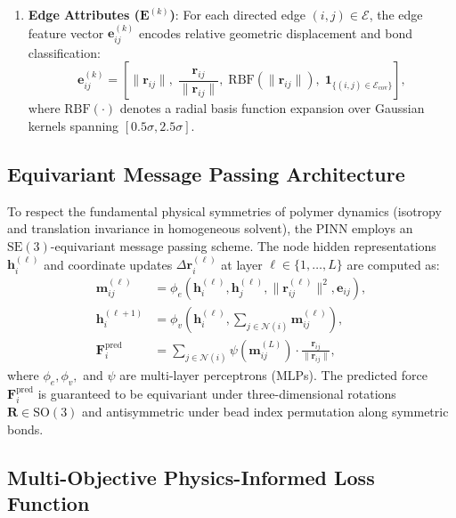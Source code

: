 \documentclass[12pt,a4paper]{article}
\begin{document}
\begin{enumerate}[label=\alph*)]
  \item \textbf{Edge Attributes ($\mathbf{E}^{(k)}$)}: For each directed edge $(i, j) \in \mathcal{E}$, the edge feature vector $\mathbf{e}_{ij}^{(k)}$ encodes relative geometric displacement and bond classification:
    \begin{equation}
      \mathbf{e}_{ij}^{(k)} = \left[ \|\mathbf{r}_{ij}\|,\; \frac{\mathbf{r}_{ij}}{\|\mathbf{r}_{ij}\|},\; \mathrm{RBF}(\|\mathbf{r}_{ij}\|),\; \mathbf{1}_{\{(i,j) \in \mathcal{E}_\text{cov}\}} \right],
    \end{equation}
    where $\mathrm{RBF}(\cdot)$ denotes a radial basis function expansion over Gaussian kernels spanning $[0.5\sigma, 2.5\sigma]$.
\end{enumerate}

\subsection{Equivariant Message Passing Architecture}
\label{sec:message-passing}

To respect the fundamental physical symmetries of polymer dynamics (isotropy and translation invariance in homogeneous solvent), the PINN employs an $\mathrm{SE}(3)$-equivariant message passing scheme. The node hidden representations $\mathbf{h}_i^{(\ell)}$ and coordinate updates $\Delta \mathbf{r}_i^{(\ell)}$ at layer $\ell \in \{1, \ldots, L\}$ are computed as:
\begin{align}
  \mathbf{m}_{ij}^{(\ell)} &= \phi_e\left(\mathbf{h}_i^{(\ell)}, \mathbf{h}_j^{(\ell)}, \|\mathbf{r}_{ij}^{(\ell)}\|^2, \mathbf{e}_{ij}\right), \label{eq:mp-edge}\\
  \mathbf{h}_i^{(\ell+1)} &= \phi_v\left(\mathbf{h}_i^{(\ell)}, \sum_{j \in \mathcal{N}(i)} \mathbf{m}_{ij}^{(\ell)}\right), \label{eq:mp-node}\\
  \mathbf{F}_i^\text{pred} &= \sum_{j \in \mathcal{N}(i)} \psi\left(\mathbf{m}_{ij}^{(L)}\right) \cdot \frac{\mathbf{r}_{ij}}{\|\mathbf{r}_{ij}\|}, \label{eq:mp-force}
\end{align}
where $\phi_e, \phi_v,$ and $\psi$ are multi-layer perceptrons (MLPs). The predicted force $\mathbf{F}_i^\text{pred}$ is guaranteed to be equivariant under three-dimensional rotations $\mathbf{R} \in \mathrm{SO}(3)$ and antisymmetric under bead index permutation along symmetric bonds.

\subsection{Multi-Objective Physics-Informed Loss Function}
\label{sec:loss}
\end{document}
